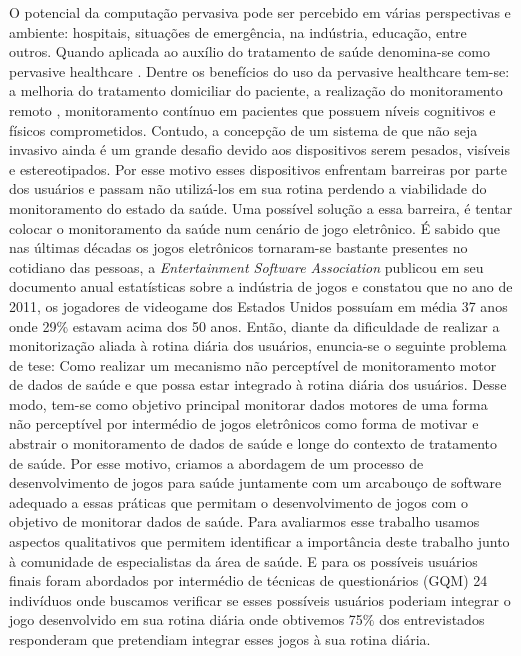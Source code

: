 O potencial da computação pervasiva pode ser percebido em várias perspectivas e ambiente: hospitais, situações de emergência, na indústria, educação, entre outros. Quando aplicada ao auxílio do tratamento de saúde denomina-se como pervasive healthcare . Dentre os benefícios do uso da pervasive healthcare tem-se: a melhoria do tratamento domiciliar do paciente, a realização do monitoramento remoto , monitoramento contínuo em pacientes que possuem níveis cognitivos e físicos comprometidos. Contudo, a concepção de um sistema de que não seja invasivo ainda é um grande desafio devido aos dispositivos serem pesados, visíveis e estereotipados. Por esse motivo esses dispositivos enfrentam barreiras por parte dos usuários e passam não utilizá-los em sua rotina perdendo a viabilidade do monitoramento do estado da saúde. Uma possível solução a essa barreira, é tentar colocar o monitoramento da saúde num cenário de jogo eletrônico.
É sabido que nas últimas décadas os jogos eletrônicos tornaram-se bastante presentes no cotidiano das pessoas, a  \textit{Entertainment Software Association} publicou em seu documento anual estatísticas sobre a indústria de jogos e constatou que no ano de 2011, os jogadores de videogame dos Estados Unidos possuíam em média 37 anos onde 29$\%$ estavam acima dos 50 anos.
Então, diante da dificuldade de realizar a monitorização aliada à rotina diária dos usuários, enuncia-se o seguinte problema de tese: Como realizar um mecanismo não perceptível de monitoramento motor de dados de saúde e que possa estar integrado à rotina diária dos usuários. Desse modo, tem-se como objetivo principal monitorar dados motores de uma forma não perceptível por intermédio de jogos eletrônicos como forma de motivar e abstrair o monitoramento de dados de saúde e longe do contexto de tratamento de saúde. Por esse motivo, criamos a abordagem de um processo de desenvolvimento de jogos para saúde juntamente com um arcabouço de software adequado a essas práticas que permitam o desenvolvimento de jogos com o objetivo de monitorar dados de saúde. 
Para avaliarmos esse trabalho usamos aspectos qualitativos que permitem identificar a importância deste trabalho junto à comunidade de especialistas da área de saúde.  E para os possíveis usuários finais foram abordados por intermédio de técnicas de questionários (GQM) 24 indivíduos onde buscamos verificar se esses possíveis usuários poderiam integrar o jogo desenvolvido em sua rotina diária onde obtivemos 75$\%$ dos entrevistados responderam que pretendiam integrar esses jogos à sua rotina diária.
